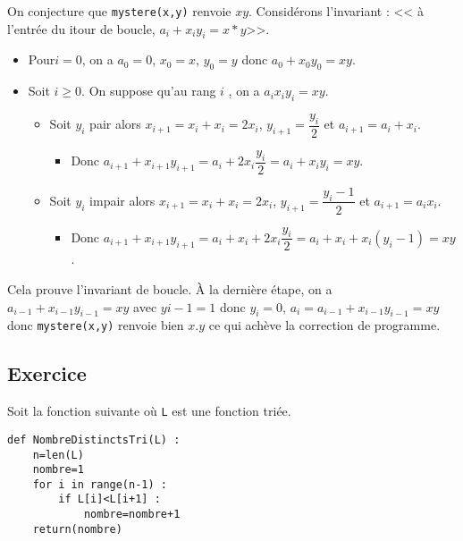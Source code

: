 \ifprof
\begin{corrige}
On conjecture que \texttt{mystere(x,y)} renvoie $xy$.
Considérons l'invariant : << à l’entrée du i\ieme tour de boucle, $a_i+x_i y_i = x *y $>>.
\begin{itemize}
\item Pour$ i=0$, on a $a_0 = 0$, $x_0 = x$, $y_0 = y$ donc $a_0 + x_0 y_0 = xy$.
\item Soit  $i\geq 0$. On suppose qu’au rang $i$ , on a $a_i x_i y_i =xy$.
\begin{itemize}
\item Soit $y_i$  pair alors $x_{i+1}=x_i+x_i = 2x_i$, $y_{i+1}=\dfrac{y_i}{2}$ et $a_{i+1}=a_i +x_i$.
\begin{itemize}
\item Donc $a_{i+1}+x_{i+1}y_{i+1}=a_i+2x_i\dfrac{y_i}{2} = a_i +x_iy_i = xy$.
\end{itemize}
\item Soit $y_i$ impair alors $x_{i+1}=x_i + x_i = 2 x_i$, $y_{i+1}=\dfrac{y_i -1}{2}$ et $a_{i+1}=a_i x_i$.
\begin{itemize}
\item Donc $a_{i+1}+x_{i+1}y_{i+1}=a_i+x_i+2 x_i \dfrac{y_i}{2} = a_i +x_i+x_i\left( y_i -1 \right) = xy$.
\end{itemize}
\end{itemize}
\end{itemize}

Cela prouve l’invariant de boucle.
À la dernière étape, on a $a_{i-1}+x_{i-1}y_{i-1}=xy$ avec $y{i-1}=1$ donc $y_i = 0$, $a_i=a_{i-1}+x_{i-1}y_{i-1} = xy$ donc \texttt{mystere(x,y)} renvoie bien $x.y$ ce qui achève la correction de programme.

\end{corrige}
\else
\fi

\subsection*{Exercice}


Soit la fonction suivante où \texttt{L} est une fonction triée.
\begin{lstlisting}
def NombreDistinctsTri(L) :
    n=len(L)
    nombre=1
    for i in range(n-1) :
        if L[i]<L[i+1] :
            nombre=nombre+1
    return(nombre)
\end{lstlisting}

